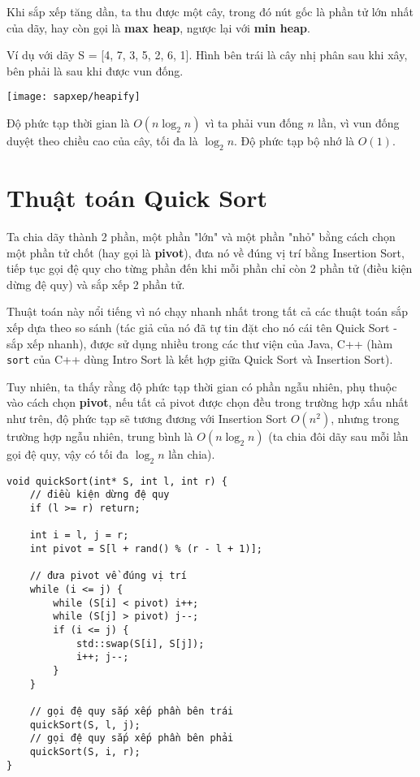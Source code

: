 Khi sắp xếp tăng dần, ta thu được một cây, trong đó nút gốc là phần tử lớn nhất của dãy, hay còn gọi là \textbf{max heap}, ngược lại với \textbf{min heap}.

Ví dụ với dãy S = [4, 7, 3, 5, 2, 6, 1]. Hình bên trái là cây nhị phân sau khi xây, bên phải là sau khi được vun đống.

\texttt{[image: sapxep/heapify]}

Độ phức tạp thời gian là $O(n\log_2n)$ vì ta phải vun đống $n$ lần, vì vun đống duyệt theo chiều cao của cây, tối đa là $\log_2n$. Độ phức tạp bộ nhớ là $O(1)$.

\section{Thuật toán Quick Sort}
Ta chia dãy thành 2 phần, một phần "lớn" và một phần "nhỏ" bằng cách chọn một phần tử chốt (hay gọi là \textbf{pivot}), đưa nó về đúng vị trí bằng Insertion Sort, tiếp tục gọi đệ quy cho từng phần đến khi mỗi phần chỉ còn 2 phần tử (điều kiện dừng đệ quy) và sắp xếp 2 phần tử.

Thuật toán này nổi tiếng vì nó chạy nhanh nhất trong tất cả các thuật toán sắp xếp dựa theo so sánh (tác giả của nó đã tự tin đặt cho nó cái tên Quick Sort - sắp xếp nhanh), được sử dụng nhiều trong các thư viện của Java, C++ (hàm \texttt{sort} của C++ dùng Intro Sort là kết hợp giữa Quick Sort và Insertion Sort).

Tuy nhiên, ta thấy rằng độ phức tạp thời gian có phần ngẫu nhiên, phụ thuộc vào cách chọn \textbf{pivot}, nếu tất cả pivot được chọn đều trong trường hợp xấu nhất như trên, độ phức tạp sẽ tương đương với Insertion Sort $O(n^2)$, nhưng trong trường hợp ngẫu nhiên, trung bình là $O(n\log_2n)$ (ta chia đôi dãy sau mỗi lần gọi đệ quy, vậy có tối đa $\log_2n$ lần chia).

\begin{verbatim}
void quickSort(int* S, int l, int r) {
    // điều kiện dừng đệ quy
    if (l >= r) return;
    
    int i = l, j = r;
    int pivot = S[l + rand() % (r - l + 1)];

    // đưa pivot về đúng vị trí
    while (i <= j) {
        while (S[i] < pivot) i++;
        while (S[j] > pivot) j--;
        if (i <= j) {
            std::swap(S[i], S[j]);
            i++; j--;
        }
    }

    // gọi đệ quy sắp xếp phần bên trái
    quickSort(S, l, j);
    // gọi đệ quy sắp xếp phần bên phải
    quickSort(S, i, r);
}
\end{verbatim}

